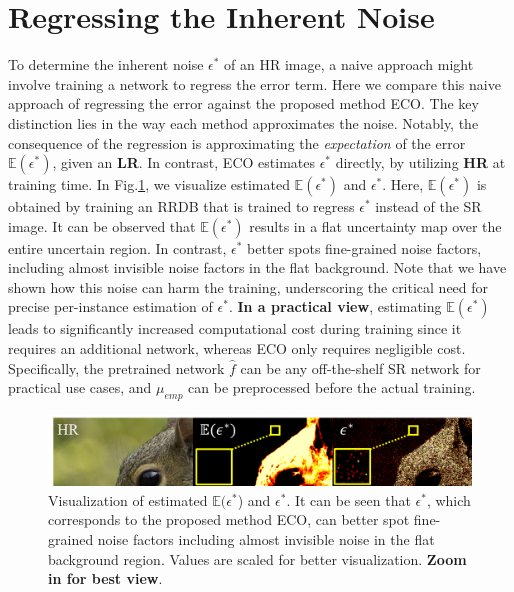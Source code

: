 \section{Regressing the Inherent Noise\hfill\phantom{PLACEHOLDER}}
To determine the inherent noise $\epsilon^*$ of an HR image, a naive approach might involve training a network to regress the error term. Here we compare this naive approach of regressing the error against the proposed method ECO. The key distinction lies in the way each method approximates the noise.
Notably, the consequence of the regression is approximating the \textit{expectation} of the error $\mathbb{E}(\epsilon^*)$, given an \textbf{LR}. 
In contrast, ECO estimates $\epsilon^*$ directly, by utilizing \textbf{HR} at training time.
In Fig.\ref{fig:noise_comparison}, we visualize estimated $\mathbb{E}(\epsilon^*)$ and $\epsilon^*$. Here, $\mathbb{E}(\epsilon^*)$ is obtained by training an RRDB that is trained to regress $\epsilon^*$ instead of the SR image. It can be observed that $\mathbb{E}(\epsilon^*)$ results in a flat uncertainty map over the entire uncertain region. In contrast, $\epsilon^*$ better spots fine-grained noise factors, including almost invisible noise factors in the flat background. Note that we have shown how this noise can harm the training, underscoring the critical need for precise per-instance estimation of $\epsilon^*$.
%
\textbf{In a practical view}, estimating $\mathbb{E}(\epsilon^*)$ leads to significantly increased computational cost during training since it requires an additional network, whereas ECO only requires negligible cost. Specifically, the pretrained network $\hat{f}$ can be any off-the-shelf SR network for practical use cases, and $\mu_{emp}$ can be preprocessed before the actual training. 


\begin{figure}[h]
    \includegraphics[width=\columnwidth]{figures/epsilon_vs_regression.png}
    \caption{
    Visualization of estimated $\mathbb{E}(\epsilon^*$) and $\epsilon^*$. It can be seen that $\epsilon^*$, which corresponds to the proposed method ECO, can better spot fine-grained noise factors including almost invisible noise in the flat background region. Values are scaled for better visualization. \textbf{Zoom in for best view}.
    }
    \label{fig:noise_comparison}
\end{figure}



